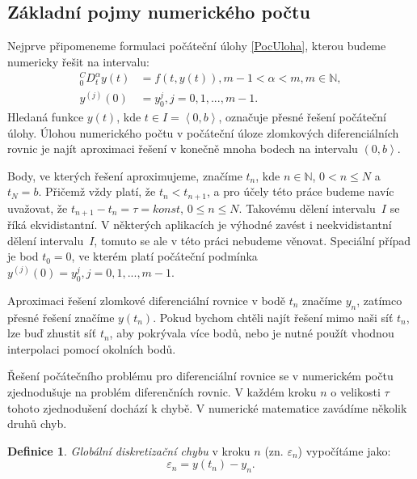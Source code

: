 \documentclass[a4paper,12pt,twoside]{article}
\theoremstyle{definition}
\newtheorem{defin}[veta]{Definice}
\theoremstyle{remark}
\numberwithin{equation}{section}
\numberwithin{table}{section}
\numberwithin{figure}{section}
\newcommand{\N}{\mathbb{N}}
\begin{document}
\subsection{Základní pojmy numerického počtu}
Nejprve připomeneme formulaci počáteční úlohy \eqref{PocUloha}, kterou budeme numericky řešit na intervalu:
\begin{equation*}
	\begin{aligned}
		^{C}_{0}D^{\alpha}_{t} y \left(t\right) &= f\left(t,y\left(t\right)\right), m-1 < \alpha < m, m \in \N, \\
		y^{\left(j\right)} \left(0\right) &= y_{0}^{j}, j=0,1,..., m-1.
	\end{aligned}	
\end{equation*}
Hledaná funkce $y\left(t\right)$, kde $t \in I = \left\langle0, b\right\rangle$, označuje přesné řešení počáteční úlohy. Úlohou numerického počtu v počáteční úloze zlomkových diferenciálních rovnic je najít aproximaci řešení v konečně mnoha bodech na intervalu $\left(0,b\right\rangle$. 

Body, ve kterých řešení aproximujeme, značíme $t_n$, kde $n \in \N$, $0<n\leq N$ a $t_N = b$. Přičemž vždy platí, že $t_n < t_{n+1}$, a pro účely této práce budeme navíc uvažovat, že $t_{n+1} - t_n = \tau = konst$, $ 0 \leq n \leq N$. Takovému dělení intervalu~$I$ se říká ekvidistantní. V některých aplikacích je výhodné zavést i neekvidistantní dělení intervalu~$I$, tomuto se ale v této práci nebudeme věnovat. Speciální případ je bod $t_0 = 0$, ve kterém platí počáteční podmínka $y^{\left(j\right)} \left(0\right) = y_{0}^{j}, j=0,1,..., m-1$.

Aproximaci řešení zlomkové diferenciální rovnice v bodě $t_n$ značíme $y_n$, zatímco přesné řešení značíme $y\left(t_n\right)$. Pokud bychom chtěli najít řešení mimo naši síť $t_n$, lze buď zhustit síť $t_n$, aby pokrývala více bodů, nebo je nutné použít vhodnou interpolaci pomocí okolních bodů.

Řešení počátečního problému pro diferenciální rovnice se v numerickém počtu zjednodušuje na problém diferenčních rovnic. V každém kroku $n$ o velikosti $\tau$ tohoto zjednodušení dochází k chybě. V numerické matematice zavádíme několik druhů chyb.

\begin{defin}\label{GlobalniDiskretizacniChyba}
	\textit{Globální diskretizační chybu} v kroku $n$ (zn. $\varepsilon_{n}$) vypočítáme jako:
	$$\varepsilon_{n} = y\left(t_{n}\right) - y_{n}.$$
\end{defin}
\end{document}
